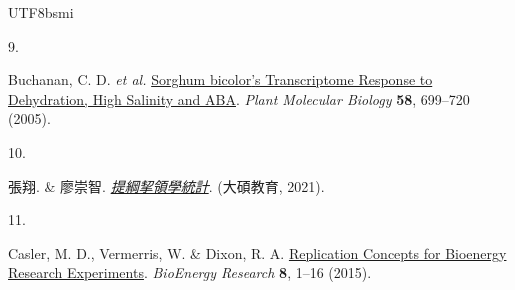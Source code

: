 \documentclass[
]{book}
\newlength{\cslhangindent}
\newlength{\csllabelwidth}
\newenvironment{CSLReferences}[2] %
 {\begin{list}{}{%
  \setlength{\itemindent}{0pt}
  \setlength{\leftmargin}{0pt}
  \setlength{\parsep}{0pt}
  \ifodd #1
   \setlength{\leftmargin}{\cslhangindent}
   \setlength{\itemindent}{-1\cslhangindent}
  \fi
  \setlength{\itemsep}{#2\baselineskip}}}
 {\end{list}}
\newcommand{\CSLLeftMargin}[1]{\parbox[t]{\csllabelwidth}{\strut#1\strut}}
\newcommand{\CSLRightInline}[1]{\parbox[t]{\linewidth - \csllabelwidth}{\strut#1\strut}}
\theoremstyle{definition}
\theoremstyle{definition}
\theoremstyle{definition}
\theoremstyle{definition}
\theoremstyle{remark}
\begin{document}
\begin{CJK}{UTF8}{bsmi}
\begin{CSLReferences}{0}{0}
\CSLLeftMargin{9. }%
\CSLRightInline{Buchanan, C. D. \emph{et al.} \href{https://doi.org/10.1007/s11103-005-7876-2}{Sorghum bicolor{'}s Transcriptome Response to Dehydration, High Salinity and ABA}. \emph{Plant Molecular Biology} \textbf{58}, 699--720 (2005).}

\CSLLeftMargin{10. }%
\CSLRightInline{張翔. \& 廖崇智. \emph{\href{https://www.books.com.tw/products/0010888833}{提綱挈領學統計}}. (大碩教育, 2021).}

\CSLLeftMargin{11. }%
\CSLRightInline{Casler, M. D., Vermerris, W. \& Dixon, R. A. \href{https://doi.org/10.1007/s12155-015-9580-7}{Replication Concepts for Bioenergy Research Experiments}. \emph{BioEnergy Research} \textbf{8}, 1--16 (2015).}

\end{CSLReferences}
\end{CJK}
\end{document}
